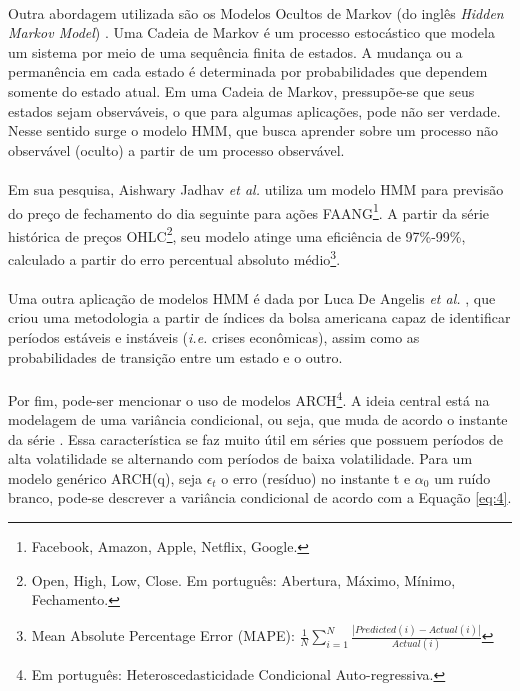 \paragraph{} Outra abordagem utilizada são os Modelos Ocultos de Markov (do inglês \textit{Hidden Markov Model}) \cite{rabiner1989tutorial}. Uma Cadeia de Markov é um processo estocástico que modela um sistema por meio de uma sequência finita de estados. A mudança ou a permanência em cada estado é determinada por probabilidades que dependem somente do estado atual. Em uma Cadeia de Markov, pressupõe-se que seus estados sejam observáveis, o que para algumas aplicações, pode não ser verdade. Nesse sentido surge o modelo HMM, que busca aprender sobre um processo não observável (oculto) a partir de um processo observável.

\paragraph{} Em sua pesquisa, Aishwary Jadhav \textit{et al.} \cite{jadhav2021forecasting} utiliza um modelo HMM para previsão do preço de fechamento do dia seguinte para ações FAANG\footnote{Facebook, Amazon, Apple, Netflix, Google.}. A partir da série histórica de preços OHLC\footnote{Open, High, Low, Close. Em português: Abertura, Máximo, Mínimo, Fechamento.}, seu modelo atinge uma eficiência de 97\%-99\%, calculado a partir do erro percentual absoluto médio\footnote{Mean Absolute Percentage Error (MAPE): \begin{math} \frac{1}{N}\sum_{i=1}^{N} \frac{|Predicted(i)-Actual(i)|}{Actual(i)} \end{math}}.

\paragraph{} Uma outra aplicação de modelos HMM é dada por Luca De Angelis \textit{et al.} \cite{de2013dynamic}, que criou uma metodologia a partir de índices da bolsa americana capaz de identificar períodos estáveis e instáveis (\textit{i.e.} crises econômicas), assim como as probabilidades de transição entre um estado e o outro.

\paragraph{} Por fim, pode-ser mencionar o uso de modelos ARCH\footnote{Em português: Heteroscedasticidade Condicional Auto-regressiva.}. A ideia central está na modelagem de uma variância condicional, ou seja, que muda de acordo o instante da série \cite{enders2008applied}. Essa característica se faz muito útil em séries que possuem períodos de alta volatilidade se alternando com períodos de baixa volatilidade. Para um modelo genérico ARCH(q), seja \begin{math}\epsilon_t\end{math} o erro (resíduo) no instante t e \begin{math}\alpha_0\end{math} um ruído branco, pode-se descrever a variância condicional de acordo com a Equação \ref{eq:4}.

